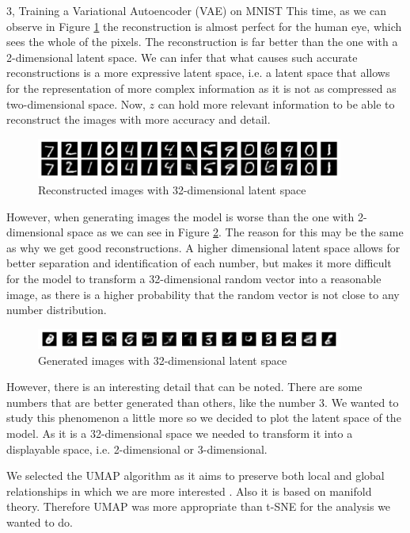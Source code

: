 \begin{task}{3, Training a Variational Autoencoder (VAE) on MNIST}
This time, as we can observe in Figure \ref{rec32d} the reconstruction is almost perfect for the human eye, which sees the whole of the pixels. The reconstruction is far better than the one with a 2-dimensional latent space. We can infer that what causes such accurate reconstructions is a more expressive latent space, i.e. a latent space that allows for the representation of more complex information as it is not as compressed as two-dimensional space. Now, \(z\) can hold more relevant information to be able to reconstruct the images with more accuracy and detail.

\begin{figure}[H]
    \centering
    \includegraphics[width=0.9\textwidth]{images/reconstruction_25_32.png}
    \caption{Reconstructed images with 32-dimensional latent space}
    \label{rec32d}
\end{figure}

However, when generating images the model is worse than the one with 2-dimensional space as we can see in Figure \ref{gen32d}. The reason for this may be the same as why we get good reconstructions. A higher dimensional latent space allows for better separation and identification of each number, but makes it more difficult for the model to transform a 32-dimensional random vector into a reasonable image, as there is a higher probability that the random vector is not close to any number distribution.

\begin{figure}[H]
    \centering
    \includegraphics[width=0.9\textwidth]{images/generated_samples_25_32.png}
    \caption{Generated images with 32-dimensional latent space}
    \label{gen32d}
\end{figure}

However, there is an interesting detail that can be noted. There are some numbers that are better generated than others, like the number 3. We wanted to study this phenomenon a little more so we decided to plot the latent space of the model. As it is a 32-dimensional space we needed to transform it into a displayable space, i.e. 2-dimensional or 3-dimensional. 

We selected the UMAP algorithm as it aims to preserve both local and global relationships in which we are more interested \cite{mcinnes2018umap}. Also it is based on manifold theory. Therefore UMAP was more appropriate than t-SNE for the analysis we wanted to do.


\end{task}
